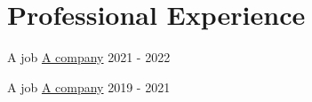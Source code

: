 
\section{Professional Experience}

\cvevent
{A job}
{\href{www.google.com}{A company}}
{2021 - 2022}
{}

\cvevent
{A job}
{\href{www.google.com}{A company}}
{2019 - 2021}
{}
